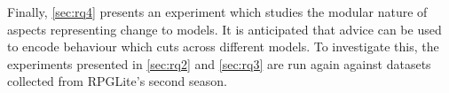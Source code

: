 Finally, \cref{sec:rq4} presents an experiment which studies the modular nature
of aspects representing change to models. It is anticipated that advice can be
used to encode behaviour which cuts across different models. To investigate
this, the experiments presented in \cref{sec:rq2} and \cref{sec:rq3} are run
again against datasets collected from RPGLite's second season. 





%
%
%
%
%
%
%
%
%
%
